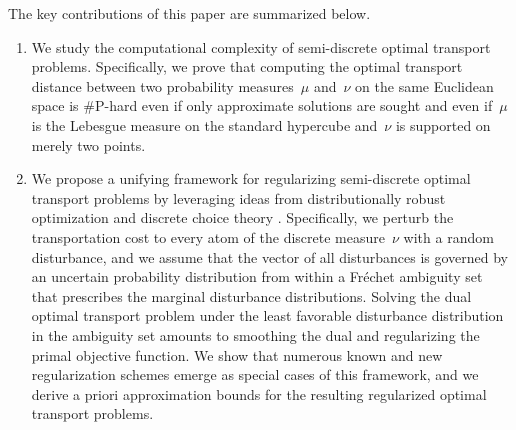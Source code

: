 \documentclass[11pt, a4paper, oneside, reqno]{article}
\begin{document}
	
	
	
	The key contributions of this paper are summarized below.
	\begin{enumerate}[label=\roman*.]
		\item We study the computational complexity of semi-discrete optimal transport problems. Specifically, we prove that computing the optimal transport distance between two probability measures~$\mu$ and~$\nu$ on the same Euclidean space is $\#$P-hard {\color{black} even if only approximate solutions are sought and} even if~$\mu$ is the Lebesgue measure on the standard hypercube and~$\nu$ is supported on merely two points. 
		\item We propose a unifying framework for regularizing semi-discrete optimal transport problems by leveraging ideas from distributionally robust optimization and discrete choice theory \citep{natarajan2009persistency, mishra2014theoretical, feng2017relation, ahipasaoglu2018convex}. Specifically, we perturb the transportation cost to every atom of the discrete measure~$\nu$ with a random disturbance, and we assume that the vector of all disturbances is governed by an uncertain probability distribution from within a Fr\'echet ambiguity set that prescribes the marginal disturbance distributions. Solving the dual optimal transport problem under the least favorable disturbance distribution in the ambiguity set amounts to smoothing the dual and regularizing the primal objective function. We show that numerous known and new regularization schemes emerge as special cases of this framework, and we derive a priori approximation bounds for the resulting regularized optimal transport problems.

\end{enumerate}
\end{document}
